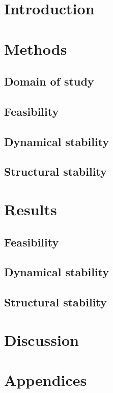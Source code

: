 \documentclass[12pt, titlepage, twoside, openright]{report}
\begin{document}
  
  \tableofcontents
  \chapter{Introduction}
  

  \chapter{Methods}\label{chap : methods}
  \section{Domain of study}\label{sec : domain of study}
  
  \FloatBarrier
  \newpage
  \section{Feasibility}\label{sec : methods feasibility}
  
  \FloatBarrier
  \newpage
  \section{Dynamical stability}\label{sec : methods dynamical stability}
  
  \FloatBarrier
  \newpage
  \section{Structural stability}
  
  \FloatBarrier

  \chapter{Results}\label{chapter : results}
  
  \section{Feasibility}
  
  \FloatBarrier
  \newpage
  \section{Dynamical stability}
  
  \FloatBarrier
  \newpage
  \section{Structural stability}\label{sec : results structural stability}
  
  \FloatBarrier

  \chapter{Discussion}
  
  \FloatBarrier

  \chapter{Appendices}
  
  \printbibliography
\end{document}

